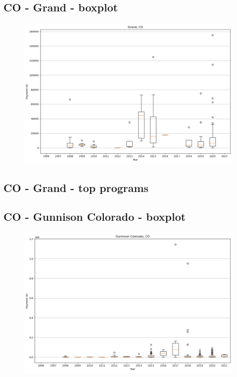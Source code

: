 \subsection*{CO - Grand - boxplot}
\begin{figure}[h]
\centering
\includegraphics[width=7in]{../output/boxplots/counties/Grand-CO_boxplot.png}
\end{figure}


\subsection*{CO - Grand - top programs}

\newpage
\subsection*{CO - Gunnison Colorado - boxplot}
\begin{figure}[h]
\centering
\includegraphics[width=7in]{../output/boxplots/counties/Gunnison Colorado-CO_boxplot.png}
\end{figure}


